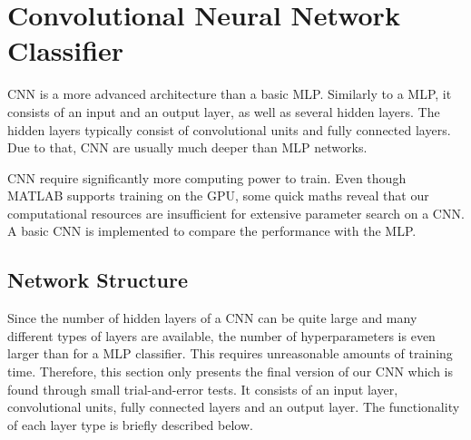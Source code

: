 \section{Convolutional Neural Network Classifier} \label{sec:CNN}
	\pagestyle{mario}

CNN is a more advanced architecture than a basic MLP. Similarly to a MLP, it consists of an input and an output layer, as well as several hidden layers. The hidden layers typically consist of convolutional units and fully connected layers. Due to that, CNN are usually much deeper than MLP networks.

CNN require significantly more computing power to train. Even though MATLAB supports training on the GPU, some quick maths reveal that our computational resources are insufficient for extensive parameter search on a CNN. A basic CNN is implemented to compare the performance with the MLP.

\subsection{Network Structure}

Since the number of hidden layers of a CNN can be quite large and many different types of layers are available, the number of hyperparameters is even larger than for a MLP classifier. This requires unreasonable amounts of training time. Therefore, this section only presents the final version of our CNN which is found through small trial-and-error tests. It consists of an input layer, convolutional units, fully connected layers and an output layer. The functionality of each layer type is briefly described below.

